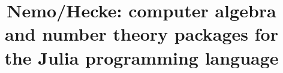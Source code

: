\documentclass{sig-alternate-05-2015}
\begin{document}

\newtheorem{alg}{Algorithm}
\newtheorem{definition}{Definition}
\newtheorem{lemma}{Lemma}
\newtheorem{theorem}{Theorem}
\newtheorem{Assertion}{Assertion}

\providecommand{\QQ}{\mathbb{Q}}
\providecommand{\ZZ}{\mathbb{Z}}
\providecommand{\NN}{\mathbb{N}}
\providecommand{\RR}{\mathbb{R}}
\providecommand{\CC}{\mathbb{C}}

\makeatletter
\def\thebibliographyy#1{%
\ifnum\addauflag=0\addauthorsection\global\addauflag=1\fi
     \section[References]{%
        {References} %
          {\vskip 0pt} %
         \@mkboth{{\refname}}{{\refname}}%
     }%
     \list{[\arabic{enumi}]}{%
         \settowidth\labelwidth{[#1]}%
         \leftmargin\labelwidth
         \advance\leftmargin\labelsep
         \advance\leftmargin\bibindent
         \parsep=0pt\itemsep=1pt %
         \itemindent -\bibindent
         \listparindent \itemindent
         \usecounter{enumi}
     }%
     \let\newblock\@empty
     \raggedright %
     \sloppy
     \sfcode`\.=1000\relax
}
\makeatother

\makeatletter
\def\Ddots{\mathinner{\mkern1mu\raise\p@
\vbox{\kern7\p@\hbox{.}}\mkern2mu
\raise4\p@\hbox{.}\mkern2mu\raise7\p@\hbox{.}\mkern1mu}}
\makeatother

\title{Nemo/Hecke: computer algebra and number theory packages for the Julia programming language}
\end{document}
